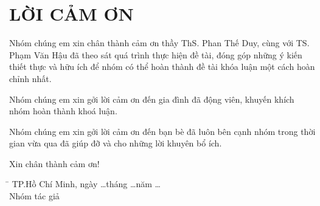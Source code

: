 \documentclass[../main-report.tex]{subfiles}
\begin{document}
\part*{LỜI CẢM ƠN}
Nhóm chúng em xin chân thành cảm ơn thầy ThS. Phan Thế Duy, cùng với TS. Phạm Văn Hậu đã
theo sát quá trình thực hiện đề tài, đóng góp những ý kiến thiết thực và hữu ích để nhóm
có thể hoàn thành đề tài khóa luận một cách hoàn chỉnh nhất.

Nhóm chúng em xin gởi lời cảm ơn đến gia đình đã động viên, khuyến khích nhóm hoàn
thành khoá luận.

Nhóm chúng em xin gởi lời cảm ơn đến bạn bè đã luôn bên cạnh nhóm trong thời gian
vừa qua đã giúp đỡ và cho những lời khuyên bổ ích.

Xin chân thành cảm ơn!

\begin{tabbing}
\hspace{7cm}\=\kill
  \> TP.Hồ Chí Minh, ngày \ldots tháng \ldots năm \ldots \\
  \> \hspace{2cm} Nhóm tác giả
\end{tabbing} 
\end{document}
